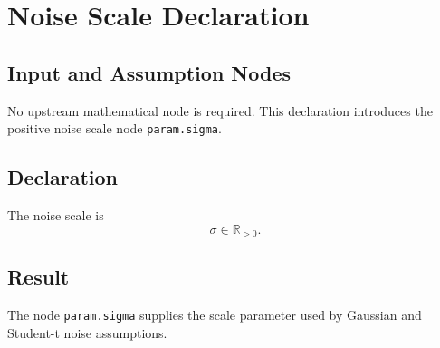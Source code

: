 \section{Noise Scale Declaration}
\label{def:sigma}

\subsection{Input and Assumption Nodes}
No upstream mathematical node is required. This declaration introduces the positive noise scale node \texttt{param.sigma}.

\subsection{Declaration}
The noise scale is
\[
  \sigma \in \mathbb{R}_{>0}.
\]

\subsection{Result}
The node \texttt{param.sigma} supplies the scale parameter used by Gaussian and Student-t noise assumptions.
